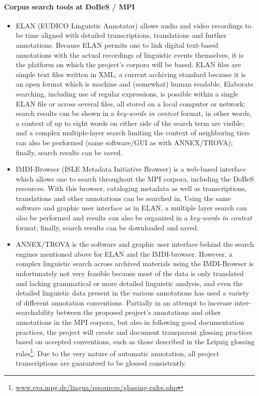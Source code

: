 \documentclass[a4paper,12pt]{article}
\begin{document}
\paragraph{Corpus search tools at DoBeS / MPI}\label{dobesTools}%
\begin{itemize}
\item ELAN (EUDICO Linguistic Annotator) allows audio and video recordings to be time aligned with detailed transcriptions, translations and further annotations. Because ELAN permits one to link digital text-based annotations with the actual recordings of linguistic events themselves, it is the platform on which the project's corpora will be based. ELAN files are simple text files written in XML, a current archiving standard because it is an open format which is machine and (somewhat) human readable. Elaborate searching, including use of regular expressions, is possible within a single ELAN file or across several files, all stored on a local computer or network; search results can be shown in a \textit{key-words in context} format, in other words, a context of up to eight words on either side of the search term are visible; and a complex multiple-layer search limiting the context of neighboring tiers can also be performed (same software/GUI as with ANNEX/TROVA); finally, search results can be saved.
\item IMDI-Browser (ISLE Metadata Initiative Browser) is a web-based interface which allows one to search throughout the MPI corpora, including the DoBeS resources. With this browser, cataloging metadata as well as transcriptions, translations and other annotations can be searched in. Using the same software and graphic user interface as in ELAN, a multiple layer search can also be performed and results can also be organized in a \textit{key-words in context} format; finally, search results can be downloaded and saved.
\item ANNEX/TROVA is the software and graphic user interface behind the search engines mentioned above for ELAN and the IMDI-browser. However, a complex linguistic search across archived materials using the IMDI-Browser is unfortunately not very feasible because most of the data is only translated and lacking grammatical or more detailed linguistic analysis, and even the detailed linguistic data present in the various annotations has used a variety of different annotation conventions. Partially in an attempt to increase inter-searchability between the proposed project's annotations and other annotations in the MPI corpora, but also in following good documentation practices, the project will create and document transparent glossing practices based on accepted conventions, such as those described in the Leipzig glossing rules\footnote{\url{www.eva.mpg.de/lingua/resources/glossing-rules.php}}. Due to the very nature of automatic annotation, all project transcriptions are guaranteed to be glossed consistently.

\end{itemize}
\end{document}
